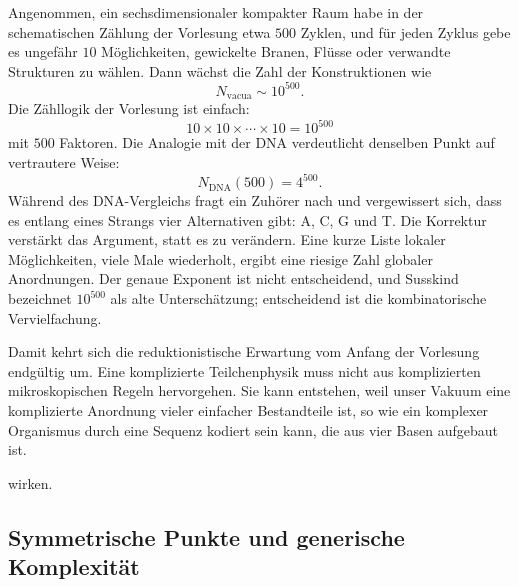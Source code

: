Angenommen, ein sechsdimensionaler kompakter Raum habe in der schematischen Zählung der Vorlesung etwa \(500\) Zyklen, und für jeden Zyklus gebe es ungefähr \(10\) Möglichkeiten, gewickelte Branen, Flüsse oder verwandte Strukturen zu wählen. Dann wächst die Zahl der Konstruktionen wie
\begin{equation}
N_{\mathrm{vacua}} \sim 10^{500}.
\end{equation}
Die Zähllogik der Vorlesung ist einfach:
\begin{equation}
10 \times 10 \times \cdots \times 10 = 10^{500}
\end{equation}
mit \(500\) Faktoren. Die Analogie mit der DNA verdeutlicht denselben Punkt auf vertrautere Weise:
\begin{equation}
N_{\mathrm{DNA}}(500)=4^{500}.
\end{equation}
Während des DNA-Vergleichs fragt ein Zuhörer nach und vergewissert sich, dass es entlang eines Strangs vier Alternativen gibt: A, C, G und T. Die Korrektur verstärkt das Argument, statt es zu verändern. Eine kurze Liste lokaler Möglichkeiten, viele Male wiederholt, ergibt eine riesige Zahl globaler Anordnungen. Der genaue Exponent ist nicht entscheidend, und Susskind bezeichnet \(10^{500}\) als alte Unterschätzung; entscheidend ist die kombinatorische Vervielfachung.

Damit kehrt sich die reduktionistische Erwartung vom Anfang der Vorlesung endgültig um. Eine komplizierte Teilchenphysik muss nicht aus komplizierten mikroskopischen Regeln hervorgehen. Sie kann entstehen, weil unser Vakuum eine komplizierte Anordnung vieler einfacher Bestandteile ist, so wie ein komplexer Organismus durch eine Sequenz kodiert sein kann, die aus vier Basen aufgebaut ist.

\begin{classroomqa}
 wirken.\end{classroomqa}

\subsection{Symmetrische Punkte und generische Komplexität}

